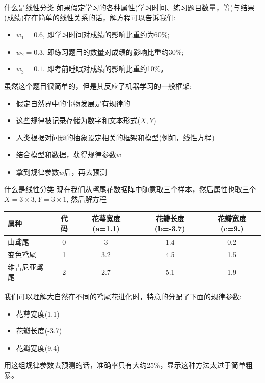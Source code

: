 \documentclass[handout]{ctexbeamer}
\begin{document}
\begin{frame}{什么是线性分类}
	如果假定学习的各种属性(学习时间、练习题目数量，等)与结果(成绩)存在简单的线性关系的话，解方程可以告诉我们:
\begin{itemize}
	\item $w_1 = 0.6$, 即学习时间对成绩的影响比重约为60\%;
	\item $w_2 = 0.3$, 即练习题目的数量对成绩的影响比重约30\%;
	\item $w_3 = 0.1$, 即考前睡眠对成绩的影响比重约10\%。
\end{itemize}

虽然这个题目很简单的，但是其反应了机器学习的一般框架:
\begin{itemize}
	\item 假定自然界中的事物发展是有规律的
	\item 这些规律被记录存储为数字和文本形式($X, Y$)
	\item 人类根据对问题的抽象设定相关的框架和模型(例如，线性方程)
	\item 结合模型和数据，获得规律参数$w$
	\item 拿到规律参数$w$后，再去预测
\end{itemize}
\end{frame}

\begin{frame}{什么是线性分类}
现在我们从鸢尾花数据阵中随意取三个样本，然后属性也取三个$X= 3 \times 3, Y = 3 \times 1$, 然后解方程
\begin{table}[H]
		\centering
{\footnotesize
		\begin{tabular}{lcccc}
		\hline 
			属种 & 代码 & 花萼宽度(a=1.1) &花瓣长度(b=-3.7) & 花瓣宽度(c=9.) \\
			\hline 
			山鸢尾 & 0 & 3 &  1.4 & 0.2 \\
			变色鸢尾 & 1 & 3.2 & 4.5  & 1.5 \\
			维吉尼亚鸢尾 & 2 & 2.7 &  5.1 & 1.9  \\
			\hline  
		\end{tabular}
}
\end{table}
我们可以理解大自然在不同的鸢尾花进化时，特意的分配了下面的规律参数:
		\begin{itemize}
			\item 花萼宽度(1.1)
			\item 花瓣长度(-3.7)
			\item 花瓣宽度(9.4)
		\end{itemize}
		用这组规律参数去预测的话，准确率只有大约25\%，显示这种方法太过于简单粗暴。
\end{frame}
\end{document}
